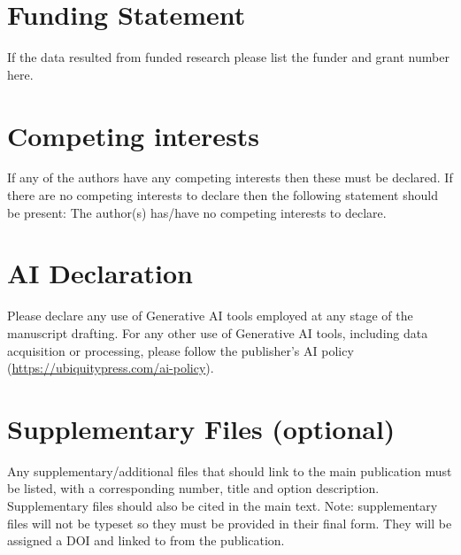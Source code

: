 \documentclass{article}
\begin{document}
\section*{Funding Statement}
If the data resulted from funded research please list the funder and grant number here.

\section*{Competing interests} 
If any of the authors have any competing interests then these must be declared. If there are no competing interests to declare then the following statement should be present: The author(s) has/have no competing interests to declare.




\section*{AI Declaration} 
Please declare any use of Generative AI tools employed at any stage of the manuscript drafting. For any other use of Generative AI tools, including data acquisition or processing, please follow the publisher’s AI policy (\url{https://ubiquitypress.com/ai-policy}).


\section*{Supplementary Files (optional)}
Any supplementary/additional files that should link to the main publication must be listed, with a corresponding number, title and option description. Supplementary files should also be cited in the main text.
Note: supplementary files will not be typeset so they must be provided in their final form. They will be assigned a DOI and linked to from the publication.
\end{document}
